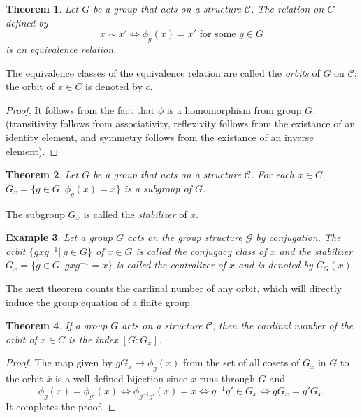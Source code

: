 \documentclass{assignment}[2019/10/15]
\theoremstyle{plain}
\newtheorem{theorem}{Theorem}[section]
\newtheorem{example}[theorem]{Example}
\begin{document}
    \begin{theorem}
        Let $G$ be a group that acts on a structure $\mathcal{C}$. The relation on $C$ defined by
        \begin{equation}
            x\sim x' \Longleftrightarrow \phi_g(x) = x'\text{ for some }g\in G
        \end{equation}
        is an equivalence relation.
    \end{theorem}

    The equivalence classes of the equivalence relation are called the \emph{orbits} of $G$ on $\mathcal{C}$; the orbit of $x\in C$ is denoted by $\overline{c}$.

    \begin{proof}
        It follows from the fact that $\phi$ is a homomorphism from group $G$. (transitivity follows from associativity, reflexivity follows from the existance of an identity element, and symmetry follows from the existance of an inverse element).
    \end{proof}

    \begin{theorem}
        Let $G$ be a group that acts on a structure $\mathcal{C}$. For each $x\in C$, $G_x=\{g\in G|\ \phi_g(x) = x\}$ is a subgroup of $G$.
    \end{theorem}

    The subgroup $G_x$ is called the \emph{stabilizer} of $x$.

    \begin{example}
        Let a group $G$ acts on the group structure $\mathcal{G}$ by conjugation. The orbit $\{gxg^{-1}|\ g\in G\}$ of $x\in G$ is called the \emph{conjugacy class} of $x$ and the stabilizer $G_x=\{g\in G|\ gxg^{-1} = x\}$ is called the \emph{centralizer} of $x$ and is denoted by $C_G(x)$.
    \end{example}

    The next theorem counts the cardinal number of any orbit, which will directly induce the group equation of a finite group.

    \begin{theorem}
        If a group $G$ acts on a structure $\mathcal{C}$, then the cardinal number of the orbit of $x\in C$ is the index $[G:G_x]$.
    \end{theorem}

    \begin{proof}
        The map given by $gG_x\mapsto \phi_g(x)$ from the set of all cosets of $G_x$ in $G$ to the orbit $\overline{x}$ is a well-defined bijection since $x$ runs through $G$ and
        \begin{equation}
            \phi_g(x)=\phi_{g'}(x)\Longleftrightarrow \phi_{g^{-1}g'}(x)=x\Longleftrightarrow g^{-1}g'\in G_x\Longleftrightarrow gG_x = g'G_x.
        \end{equation}
        It completes the proof.
    \end{proof}
\end{document}
